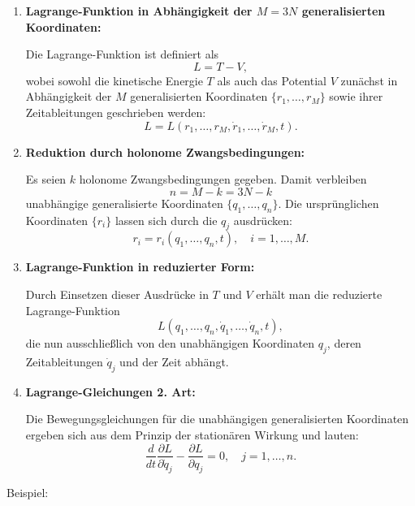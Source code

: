 \documentclass[10pt, letterpaper]{article}
\begin{document}
\begin{enumerate}[label=\textbf{\arabic*)}, itemsep=1.5em]

  \item \textbf{Lagrange-Funktion in Abhängigkeit der $M = 3N$ generalisierten Koordinaten:}

  Die Lagrange-Funktion ist definiert als
  \[
  L = T - V,
  \]
  wobei sowohl die kinetische Energie \( T \) als auch das Potential \( V \) zunächst in Abhängigkeit der $M$ generalisierten Koordinaten \( \{ r_1, \dotsc, r_M \} \) sowie ihrer Zeitableitungen geschrieben werden:
  \[
  L = L(r_1, \dotsc, r_M, \dot{r}_1, \dotsc, \dot{r}_M, t).
  \]

  \item \textbf{Reduktion durch holonome Zwangsbedingungen:}

  Es seien \( k \) holonome Zwangsbedingungen gegeben. Damit verbleiben
  \[
  n = M - k = 3N - k
  \]
  unabhängige generalisierte Koordinaten \( \{ q_1, \dotsc, q_n \} \). Die ursprünglichen Koordinaten \( \{ r_i \} \) lassen sich durch die \( q_j \) ausdrücken:
  \[
  r_i = r_i(q_1, \dotsc, q_n, t), \quad i = 1, \dotsc, M.
  \]

  \item \textbf{Lagrange-Funktion in reduzierter Form:}

  Durch Einsetzen dieser Ausdrücke in \( T \) und \( V \) erhält man die reduzierte Lagrange-Funktion
  \[
  L(q_1, \dotsc, q_n, \dot{q}_1, \dotsc, \dot{q}_n, t),
  \]
  die nun ausschließlich von den unabhängigen Koordinaten \( q_j \), deren Zeitableitungen \( \dot{q}_j \) und der Zeit abhängt.

  \item \textbf{Lagrange-Gleichungen 2. Art:}

  Die Bewegungsgleichungen für die unabhängigen generalisierten Koordinaten ergeben sich aus dem Prinzip der stationären Wirkung und lauten:
  \[
  \frac{d}{dt} \frac{\partial L}{\partial \dot{q}_j} - \frac{\partial L}{\partial q_j} = 0,
  \quad j = 1, \dotsc, n.
  \]

\end{enumerate}







Beispiel: 
\end{document}
